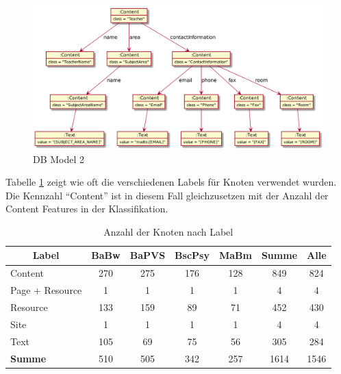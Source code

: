     \begin{figure}[htb]
        \centering
        \includegraphics[width=\textwidth]{../resources/findings/case-study-1/dbmodel/dbmodel2.png}
        \caption{DB Model 2}
        \label{image:findingTeachersFiguresDbModel2}
    \end{figure}

    Tabelle \ref{table:findingsTeachersFiguresNodesByLabel}
    zeigt wie oft die verschiedenen Labels für Knoten verwendet wurden.
    Die Kennzahl "`Content"' ist in diesem Fall gleichzusetzen mit
    der Anzahl der Content Features in der Klassifikation.

    \begin{table}[htb]
        \centering
        \begin{tabular}{|l|c|c|c|c|c|c|}
            \hline
            \multicolumn{1}{|c|}{\textbf{Label}} & \textbf{BaBw} & \textbf{BaPVS} & \textbf{BscPsy} & \textbf{MaBm} & \textbf{Summe} & \textbf{Alle} \\ \hline
            Content                                     & 270           & 275            & 176             & 128           & 849            & 824           \\ \hline
            Page + Resource                             & 1             & 1              & 1               & 1             & 4              & 4             \\ \hline
            Resource                                    & 133           & 159            & 89              & 71            & 452            & 430           \\ \hline
            Site                                        & 1             & 1              & 1               & 1             & 4              & 4             \\ \hline
            Text                                        & 105           & 69             & 75              & 56            & 305            & 284           \\ \hline
            \hline
            \textbf{Summe}                              & 510           & 505            & 342             & 257           & 1614           & 1546          \\ \hline
        \end{tabular}
        \caption{Anzahl der Knoten nach Label}
        \label{table:findingsTeachersFiguresNodesByLabel}
    \end{table}

